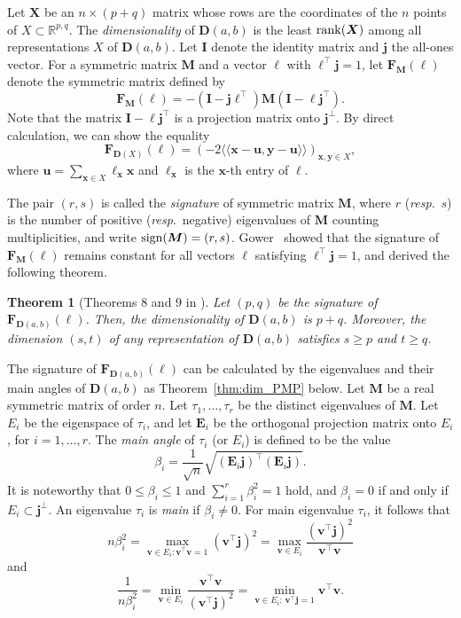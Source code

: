 \documentclass[a4paper, 11pt]{article}
\newcommand{\R}{\mathbb{R}}
\newcommand{\E}{\boldsymbol{E}}
\newcommand{\I}{\boldsymbol{I}}
\newcommand{\D}{\boldsymbol{D}}
\newcommand{\F}{\boldsymbol{F}}
\newcommand{\M}{\boldsymbol{M}}
\newcommand{\X}{\boldsymbol{X}}
\newcommand{\x}{\boldsymbol{x}}
\newcommand{\y}{\boldsymbol{y}}
\newcommand{\av}{\mathfrak{a}}
\newcommand{\jv}{\boldsymbol{j}}
\newcommand{\vv}{\boldsymbol{v}}
\newcommand{\uv}{\boldsymbol{u}}
\newcommand{\el}{\boldsymbol{\ell}}
\newcommand{\la}{\langle}
\newcommand{\ra}{\rangle}
\newtheorem{theorem}{Theorem}[section]
\theoremstyle{definition}
\begin{document}
Let $\X$ be an $n\times (p+q)$ matrix whose rows
 are the coordinates of the $n$ points of $X\subset \R^{p,q}$. 
The {\it dimensionality} of $\D(a,b)$ is the least ${\rm rank}(\X)$ among all representations $X$ of $\D(a,b)$. 
Let $\I$ denote the identity matrix and $\jv$ the all-ones vector. 
For a symmetric matrix $\M$ and a vector $\el$ with $\el^\top \jv=1$, let $\F_{\M}(\el)$ denote the symmetric matrix defined by
\[
\F_{\M}(\el)=- (\I-\jv \el^{\top})\M (\I-\el \jv^{\top}). 
\]
Note that the matrix $\I-\el \jv^{\top}$ is a projection matrix onto 
$\jv^\perp$. 
By direct calculation, we can show the equality 
\[
\F_{\D(X)}(\el)=
(-2\la\la \x-\uv,\y-\uv\ra \ra )_{\x,\y \in X}, \]
 where $\uv=
\sum_{\x \in X} \el_{\x}\x$ and $\el_{\x}$ is the $\x$-th entry of $\el$. 

The pair $(r,s)$ is called the {\it signature}  of symmetric matrix $\M$, where $r$ ({\it resp}.\ $s$) is the number of positive ({\it resp}.\ negative) eigenvalues of $\M$ counting multiplicities, 
and write ${\rm sign}(\M)=(r,s)$. 
Gower~\cite{G85} showed that the signature of $\F_{\M}(\el)$ remains constant for all vectors $\el$ satisfying $\el^\top \jv = 1$, and derived the following theorem. 
\begin{theorem}[Theorems 8 and 9 in \cite{G85}]
Let $(p,q)$ be the signature of $\F_{\D (a,b)}(\el)$.  Then, the dimensionality of $\D(a,b)$ is $p+q$.  Moreover, 
the dimension $(s,t)$ of any representation of $\D (a,b)$  satisfies $s \geq p$ and $t \geq q$.  
\end{theorem}  

The signature of $\F_{\D (a,b)}(\el)$ can be calculated
by the eigenvalues and their main angles of  $\D (a,b)$ as Theorem~\ref{thm:dim_PMP} below. 
Let $\M$ be a real symmetric matrix of order $n$. Let $\tau_1,\ldots, \tau_r$ be the distinct eigenvalues of $\M$. 
Let $E_i$ be the eigenspace of $\tau_i$, and let $\E_i$ be the orthogonal projection matrix onto $E_i$, for $i = 1, \ldots, r$.
The {\it main angle} of $\tau_i$ (or $E_i$) is defined to be the value
\[
\beta_i=\frac{1}{\sqrt{n}}\sqrt{ (\E_i \jv)^\top (\E_i \jv)}. 
\]
It is noteworthy that $0\leq \beta_i \leq 1$ and $\sum_{i=1}^r \beta_i^2=1$ hold, and $\beta_i=0$ if and only if $E_i \subset \jv^\perp$. 
An eigenvalue $\tau_i$ is {\it main} if $\beta_i \ne 0$. 
For main eigenvalue $\tau_i$,  it follows that
\[
n\beta_i^2=\max_{\vv \in E_i: \vv^\top \vv=1} (\vv^\top \jv)^2=
\max_{\vv \in E_i}\frac{(\vv^\top \jv)^2}{\vv^\top \vv}
\]
and 
\begin{equation} \label{eq:mainangle}
\frac{1}{n\beta_i^2}= \min_{\vv \in E_i} \frac{\vv^\top \vv}{(\vv^\top \jv)^2}=
\min_{\vv \in E_i:\, \vv^\top \jv=1} \vv^\top \vv.  
\end{equation}
\end{document}
